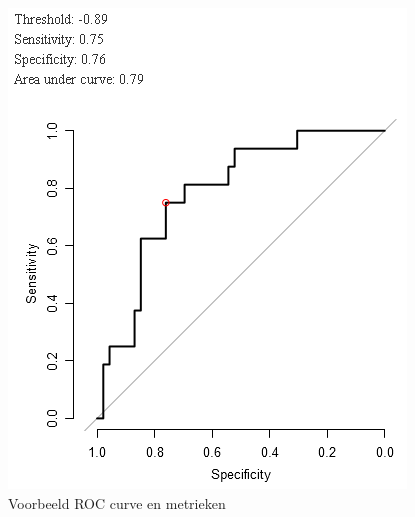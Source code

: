 \begin{abstract*}
\begin{figure}
	\centering
	\includegraphics[scale=.7]{images/roc_curve}
	\caption{Voorbeeld ROC curve en metrieken}
	\label{fig:D:evaluation-roc}
\end{figure}


\end{abstract*}
